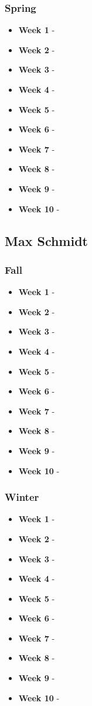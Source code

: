 \documentclass[onecolumn, draftclsnofoot,10pt, compsoc]{IEEEtran}
\begin{document}
			\subsubsection{Spring}
				\begin{itemize}
					\item \textbf{Week 1} - 
					\item \textbf{Week 2} - 
					\item \textbf{Week 3} - 
					\item \textbf{Week 4} - 
					\item \textbf{Week 5} - 
					\item \textbf{Week 6} - 
					\item \textbf{Week 7} - 
					\item \textbf{Week 8} - 
					\item \textbf{Week 9} - 
					\item \textbf{Week 10} - 
				\end{itemize}
		\subsection{Max Schmidt}
			\subsubsection{Fall}
				\begin{itemize}
					\item \textbf{Week 1} - 
					\item \textbf{Week 2} - 
					\item \textbf{Week 3} - 
					\item \textbf{Week 4} - 
					\item \textbf{Week 5} - 
					\item \textbf{Week 6} - 
					\item \textbf{Week 7} - 
					\item \textbf{Week 8} - 
					\item \textbf{Week 9} - 
					\item \textbf{Week 10} - 
				\end{itemize}
			\subsubsection{Winter}
				\begin{itemize}
					\item \textbf{Week 1} - 
					\item \textbf{Week 2} - 
					\item \textbf{Week 3} - 
					\item \textbf{Week 4} - 
					\item \textbf{Week 5} - 
					\item \textbf{Week 6} - 
					\item \textbf{Week 7} - 
					\item \textbf{Week 8} - 
					\item \textbf{Week 9} - 
					\item \textbf{Week 10} - 
				\end{itemize}
\end{document}

